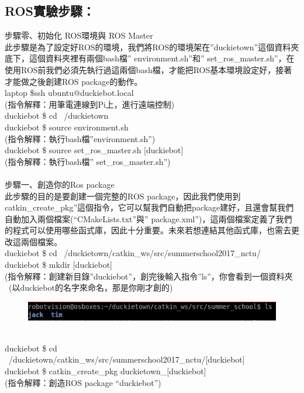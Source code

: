 \documentclass{article}
\begin{document}
\subsection{ROS實驗步驟：}
步驟零、初始化 ROS環境與 ROS Master
\\此步驟是為了設定好ROS的環境，我們將ROS的環境架在”duckietown”這個資料夾底下，這個資料夾裡有兩個bash檔” environment.sh”和” set\_ros\_master.sh”，在使用ROS前我們必須先執行過這兩個bash檔，才能把ROS基本環境設定好，接著才能做之後創建ROS package的動作。
\\laptop \$ssh ubuntu@duckiebot.local
\\(指令解釋：用筆電連線到Pi上，進行遠端控制)
\\duckiebot \$ cd ~/duckietown
\\duckiebot \$ source environment.sh
\\(指令解釋：執行bash檔”environment.sh”)
\\duckiebot \$ source set\_ros\_master.sh [duckiebot]
\\(指令解釋：執行bash檔” set\_ros\_master.sh”)
\\\\步驟一、創造你的Ros package 
\\此步驟的目的是要創建一個完整的ROS package，因此我們使用到catkin\_create\_pkg”這個指令，它可以幫我們自動把package建好，且還會幫我們自動加入兩個檔案(“CMakeLists.txt”與” package.xml”)，這兩個檔案定義了我們的程式可以使用哪些函式庫，因此十分重要。未來若想連結其他函式庫，也需去更改這兩個檔案。
\\duckiebot \$ cd ~/duckietown/catkin\_ws/src/summerschool2017\_nctu/
\\duckiebot \$ mkdir [duckiebot]
\\(指令解釋：創建新目錄”duckiebot”，創完後輸入指令”ls”，你會看到一個資料夾  (以duckiebot的名字來命名，那是你剛才創的)
\begin{figure}[htp]
    \begin{center}
        \includegraphics[width=400pt]{pic/5_2_1.png}
    \end{center}
\end{figure}
\\
duckiebot \$ cd ~/duckietown/catkin\_ws/src/summerschool2017\_nctu/[duckiebot]
\\duckiebot \$ catkin\_create\_pkg duckietown\_[duckiebot]
\\(指令解釋：創造ROS package “duckiebot”)
\end{document}
